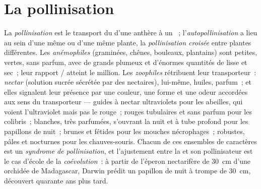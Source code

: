 \section{La pollinisation}

\begin{definition}\label{def:b2:angiosperm-reproduction:pollination}
La \emph{pollinisation} est le transport du  d'une anthère à un
~; l'\emph{autopollinisation} a lieu au sein d'une même 
ou d'une même plante, la \emph{pollinisation croisée} entre plantes
différentes. Les  \emph{anémophiles} (graminées, chênes, bouleaux,
plantains) sont petites, vertes, sans parfum, avec de grands 
plumeux et d'énormes quantités de  lisse et sec~; leur rapport
/ atteint le million. Les  \emph{zoophiles}
rétribuent leur transporteur~: \emph{nectar} (solution sucrée sécrétée
par des nectaires),  lui-même, huiles, parfum~; et elles
signalent leur présence par une couleur, une forme et une odeur
accordées aux sens du transporteur --- guides à nectar ultraviolets pour
les abeilles, qui voient l'ultraviolet mais pas le rouge~; 
rouges tubulaires et sans parfum pour les colibris~;  blanches,
très parfumées, s'ouvrant la nuit et à tube profond pour les
papillons de nuit~;  brunes et fétides pour les mouches
nécrophages~;  robustes, pâles et nocturnes pour les chauves-souris.
Chacun de ces ensembles de caractères est un \emph{syndrome de
pollinisation}, et l'ajustement entre la  et son pollinisateur est
le cas d'école de la \emph{coévolution}~: à partir de l'éperon
nectarifère de \qty{30}{cm} d'une orchidée de Madagascar, Darwin
prédit un papillon de nuit à trompe de \qty{30}{cm}, découvert quarante
ans plus tard.
\end{definition}

